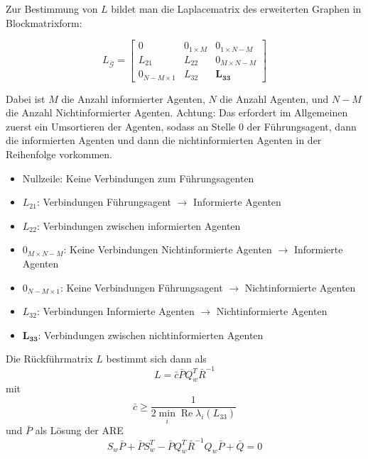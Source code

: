 Zur Bestimmung von $L$ bildet man die Laplacematrix des erweiterten Graphen in Blockmatrixform:

\begin{equation}
    L_{\overbar{\mathcal{G}}} = \begin{bmatrix}
        0 & 0_{1\times M} & 0_{1 \times N-M}\\
        L_{21} & L_{22} & 0_{M \times N-M} \\
        0_{N-M \times 1} & L_{32} & \bm{L_{33}}
    \end{bmatrix}
\end{equation}

Dabei ist $M$ die Anzahl informierter Agenten, $N$ die Anzahl Agenten, und $N-M$ die
Anzahl Nichtinformierter Agenten.
Achtung: Das erfordert im Allgemeinen zuerst ein Umsortieren der Agenten, sodass
an Stelle 0 der Führungsagent, dann die informierten Agenten und dann die
nichtinformierten Agenten in der Reihenfolge vorkommen.

\begin{itemize}
    \item Nullzeile: Keine Verbindungen zum Führungsagenten
    \item $L_{21}$: Verbindungen Führungsagent $\rightarrow$ Informierte Agenten
    \item $L_{22}$: Verbindungen zwischen informierten Agenten
    \item $0_{M \times N-M}$: Keine Verbindungen Nichtinformierte Agenten $\rightarrow$ Informierte Agenten
    \item $0_{N-M \times 1}$: Keine Verbindungen Führungsagent $\rightarrow$ Nichtinformierte Agenten
    \item $L_{32}$: Verbindungen Informierte Agenten $\rightarrow$ Nichtinformierte Agenten
    \item $\bm{L_{33}}$: Verbindungen zwischen nichtinformierten Agenten
\end{itemize}

Die Rückführmatrix $L$ bestimmt sich dann als
\begin{equation}
    L= \bar{c} \bar{P} Q_w^T \bar{R}^{-1}
\end{equation}
mit
\begin{equation}
    \bar{c} \geq \frac{1}{2 \min_{i}\operatorname{Re} \lambda_i(L_{33})}
\end{equation}
und $\bar{P}$ als Lösung der ARE
\begin{equation}
    S_w \bar{P} + \bar{P} S_w^T - \bar{P} Q_w^T \bar{R}^{-1} Q_w \bar{P} + \bar{Q} = 0
\end{equation}

